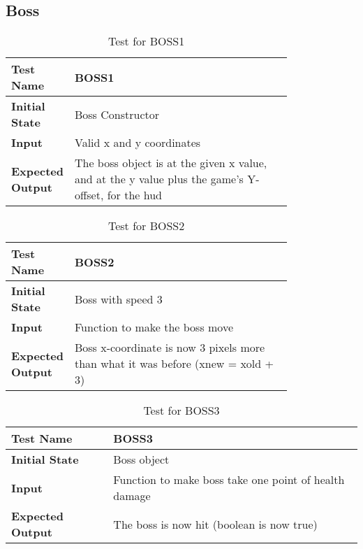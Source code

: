 \documentclass[12pt, titlepage]{article}
\begin{document}
\newpage

\subsection{Boss}

\begin{table}[!htbp]
	
	\begin{tabular}[r]{|l|p{0.8\linewidth}|}
		
		\hline
		
		\textbf{Test Name} & BOSS1 \\ 
		\hline
		\textbf{Initial State} & Boss Constructor \\ 
		\hline
		\textbf{Input} & Valid x and y coordinates \\ 
		\hline 
		\textbf{Expected Output} & The boss object is at the given x value, and at the y value plus the game's Y-offset, for the hud  \\ 
		\hline
		
	\end{tabular}
	\caption{Test for BOSS1}
	\label{Table}
\end{table}

\begin{table}[!htbp]
	
	\begin{tabular}[r]{|l|p{0.8\linewidth}|}
		
		\hline
		
		\textbf{Test Name} & BOSS2 \\ 
		\hline
		\textbf{Initial State} & Boss with speed 3 \\ 
		\hline
		\textbf{Input} & Function to make the boss move \\ 
		\hline 
		\textbf{Expected Output} & Boss x-coordinate is now 3 pixels more than what it was before (xnew = xold + 3)  \\ 
		\hline
		
	\end{tabular}
	\caption{Test for BOSS2}
	\label{Table}
\end{table}

\begin{table}[!htbp]
	
	\begin{tabular}[r]{|l|l|}
		
		\hline
		
		\textbf{Test Name} & BOSS3 \\ 
		\hline
		\textbf{Initial State} & Boss object \\ 
		\hline
		\textbf{Input} & Function to make boss take one point of health damage \\ 
		\hline 
		\textbf{Expected Output} & The boss is now hit (boolean is now true)  \\ 
		\hline
		
	\end{tabular}
	\caption{Test for BOSS3}
	\label{Table}
\end{table}
\end{document}
